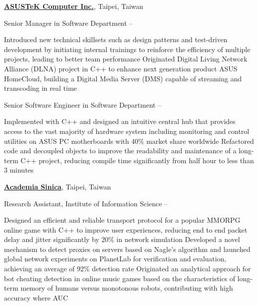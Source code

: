 \documentclass[a4paper,10pt,oneside]{article}
\begin{document}
\begin{body}
\EntryGap
\href{http://www.asus.com/US/}
{\textbf{ASUSTeK Computer Inc.}}, Taipei, Taiwan

\par
Senior Manager in Software Department
\hfill
{} --
\begin{detail}
\BulletItem
Introduced new technical skillsets such as design patterns and test-driven development by initiating internal trainings to reinforce the efficiency of multiple projects, leading to better team performance
\BulletItem
Originated Digital Living Network Alliance (DLNA) project in C++ to enhance next generation product ASUS HomeCloud, building a Digital Media Server (DMS) capable of streaming and transcoding in real time
\end{detail}

\par
Senior Software Engineer in Software Department
\hfill
{} --
\begin{detail}
\BulletItem
Implemented with C++ and designed an intuitive central hub that provides access to the vast majority of hardware system including monitoring and control utilities on ASUS PC motherboards with 40\% market share worldwide
\BulletItem
Refactored code and decoupled objects to improve the readability and maintenance of a long-term C++ project, reducing compile time significantly from half hour to less than 3 minutes
\end{detail}

\EntryGap
\href{http://www.iis.sinica.edu.tw/index_en.html}
{\textbf{Academia Sinica}}, Taipei, Taiwan
\par
Research Assistant, Institute of Information Science
\hfill
{} --
\begin{detail}
\BulletItem
Designed an efficient and reliable transport protocol for a popular MMORPG online game with C++ to improve user experiences, reducing end to end packet delay and jitter significantly by 20\% in network simulation
\BulletItem
Developed a novel mechanism to detect proxies on servers based on Nagle's algorithm and launched global network experiments on PlanetLab for verification and evaluation, achieving an average of 92\% detection rate
\BulletItem
Originated an analytical approach for bot cheating detection in online music games based on the characteristics of long-term memory of humans versus monotonous robots, contributing with high accuracy where AUC 
\end{detail}


\end{body}
\end{document}
